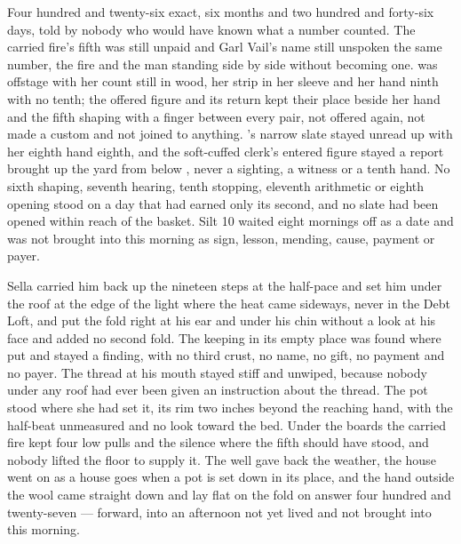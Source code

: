 Four hundred and twenty-six exact, six months and two hundred and forty-six days, told by nobody who would have known what a number counted. The carried fire's fifth was still unpaid and Garl Vail's name still unspoken the same number, the fire and the man standing side by side without becoming one.  was offstage with her count still in wood, her strip in her sleeve and her hand ninth with no tenth; the offered figure and its return kept their place beside her hand and the fifth shaping with a finger between every pair, not offered again, not made a custom and not joined to anything. 's narrow slate stayed unread up  with her eighth hand eighth, and the soft-cuffed clerk's entered figure stayed a report brought up the yard from  below , never a sighting, a witness or a tenth hand. No sixth shaping, seventh hearing, tenth stopping, eleventh arithmetic or eighth opening stood on a day that had earned only its second, and no slate had been opened within reach of the basket. Silt 10 waited eight mornings off as a date and was not brought into this morning as sign, lesson, mending, cause, payment or payer.

Sella carried him back up the nineteen steps at the half-pace and set him under the roof at the edge of the light where the heat came sideways, never in the Debt Loft, and put the fold right at his ear and under his chin without a look at his face and added no second fold. The keeping in its empty place was found where put and stayed a finding, with no third crust, no name, no gift, no payment and no payer. The thread at his mouth stayed stiff and unwiped, because nobody under any roof had ever been given an instruction about the thread. The pot stood where she had set it, its rim two inches beyond the reaching hand, with the half-beat unmeasured and no look toward the bed. Under the boards the carried fire kept four low pulls and the silence where the fifth should have stood, and nobody lifted the floor to supply it. The well gave back the weather, the house went on as a house goes when a pot is set down in its place, and the hand outside the wool came straight down and lay flat on the fold on answer four hundred and twenty-seven --- forward, into an afternoon not yet lived and not brought into this morning.
